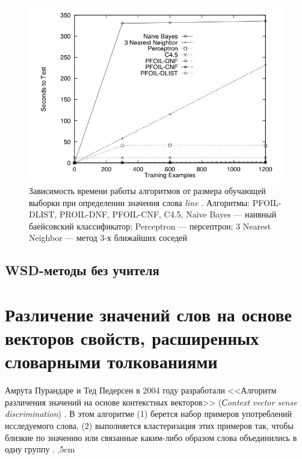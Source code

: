 \documentclass{article}
\begin{document}
\begin{articletext}
\begin{figure}[H]
\includegraphics[keepaspectratio=true,
 width=0.9\columnwidth]{line_wsd_3_testing_time.png}
\caption{Зависимость времени работы алгоритмов от размера обучающей выборки при определении значения слова \textit{line} \cite{Mooney 1996}. Алгоритмы: PFOIL-DLIST, PROIL-DNF, PFOIL-CNF, C4.5, Naive Bayes --- наивный баейсовский классификатор; Perceptron --- персептрон; 3 Nearest Neighbor --- метод 3-х ближайших соседей}
\label{kor3}
\end{figure}

\bfullwidth
\begin{center}
\section{WSD-методы без учителя}
\end{center}
\efullwidth

\section{Различение значений слов на основе векторов свойств, расширенных словарными толкованиями}

\begin{flushright}
\end{flushright}

Амрута Пурандаре и Тед Педерсен в 2004 году разработали <<Алгоритм различения значений на основе контекстных векторов>> (\textit{Сontext vector sense discrimination}) \cite{Purandare 2004}. В этом алгоритме (1) берется набор примеров употреблений исследуемого слова, (2) выполняется кластеризация этих примеров так, чтобы близкие по значению или связанные каким-либо образом слова объединились в одну группу \cite{Purandare 2004}.
,5cm


\end{articletext}
\end{document}
